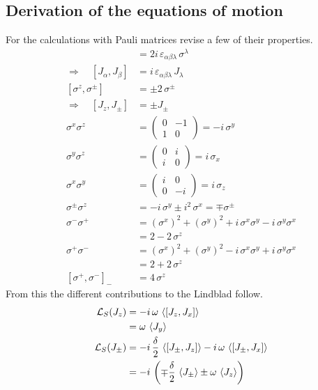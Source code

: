 \documentclass{article}
\begin{document}
\begin{appendices}

\section{Derivation of the equations of motion}
\label{appendix:eqm_derv}

For the calculations with Pauli matrices revise a few of their properties.
\begin{align*}
    [\sigma^\alpha,\sigma^\beta]&=2i\,\varepsilon_{\alpha\beta\lambda}\,\sigma^\lambda\\
    \Rightarrow\quad[J_\alpha,J_\beta]&=i\,\varepsilon_{\alpha\beta\lambda}\,J_\lambda\\
    [\sigma^z,\sigma^\pm]&=\pm2\,\sigma^\pm\\
    \Rightarrow\quad[J_z,J_\pm]&=\pm J_\pm\\
    \sigma^x\sigma^z&=\left( \begin{array}{cc}
         0 & -1  \\
         1& 0
    \end{array}\right)=-i\,\sigma^y\\
    \sigma^y\sigma^z&=\left( \begin{array}{cc}
         0 & i  \\
         i& 0
    \end{array}\right)=i\,\sigma_x\\
    \sigma^x\sigma^y&=\left( \begin{array}{cc}
         i & 0  \\
         0 & -i
    \end{array}\right)=i\,\sigma_z\\
    \sigma^\pm\sigma^z&=-i\,\sigma^y\pm i^2\,\sigma^x=\mp\sigma^\pm\\
    \sigma^-\sigma^+&=(\sigma^x)^2+(\sigma^y)^2+i\,\sigma^x\sigma^y-i\,\sigma^y\sigma^x\\
    &=2-2\,\sigma^z\\
    \sigma^+\sigma^-&=(\sigma^x)^2+(\sigma^y)^2-i\,\sigma^x\sigma^y+i\,\sigma^y\sigma^x\\
    &=2+2\,\sigma^z\\
    [\sigma^+,\sigma^-]_-&=4\,\sigma^z
\end{align*}
From this the different contributions to the Lindblad follow.
\begin{align*}
    \mathcal{L}_S(J_z)&=-i\,\omega\,\braket{[J_z,J_x]}\\
    &=\omega\,\braket{J_y}\\
    \mathcal{L}_S(J_\pm)&=-i\,\frac{\delta}{2}\,\braket{[J_\pm,J_z]}-i\,\omega\,\braket{[J_\pm,J_x]}\\
    &=-i\,\left(\mp\frac{\delta}{2}\, \braket{J_\pm} \pm \omega\, \braket{J_z}\right)
\end{align*}


\end{appendices}
\end{document}
